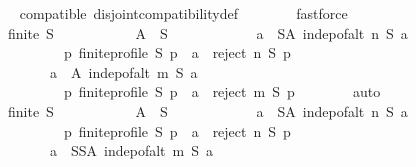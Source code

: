 \begin{isabellebody}
\ \ \ \ \ \ \isamarkupfalse%
\ compatible\ disjoint{\isacharunderscore}{\kern0pt}compatibility{\isacharunderscore}{\kern0pt}def\isanewline
\ \ \ \ \ \ \isamarkupfalse%
\ fastforce\isanewline
\ \ \ \ \isamarkupfalse%
\isanewline
\ \ \ \ \ \ {\isachardoublequoteopen}finite\ S\ {\isasymlongrightarrow}\isanewline
\ \ \ \ \ \ \ \ \ \ {\isacharparenleft}{\kern0pt}{\isasymexists}A\ {\isasymsubseteq}\ S{\isachardot}{\kern0pt}\isanewline
\ \ \ \ \ \ \ \ \ \ \ \ {\isacharparenleft}{\kern0pt}{\isasymforall}a\ {\isasymin}\ S{\isacharminus}{\kern0pt}A{\isachardot}{\kern0pt}\ indep{\isacharunderscore}{\kern0pt}of{\isacharunderscore}{\kern0pt}alt\ n\ S\ a\ {\isasymand}\isanewline
\ \ \ \ \ \ \ \ \ \ \ \ \ \ {\isacharparenleft}{\kern0pt}{\isasymforall}p{\isachardot}{\kern0pt}\ finite{\isacharunderscore}{\kern0pt}profile\ S\ p\ {\isasymlongrightarrow}\ a\ {\isasymin}\ reject\ n\ S\ p{\isacharparenright}{\kern0pt}{\isacharparenright}{\kern0pt}\ {\isasymand}\isanewline
\ \ \ \ \ \ \ \ \ \ \ \ {\isacharparenleft}{\kern0pt}{\isasymforall}a\ {\isasymin}\ A{\isachardot}{\kern0pt}\ indep{\isacharunderscore}{\kern0pt}of{\isacharunderscore}{\kern0pt}alt\ m\ S\ a\ {\isasymand}\isanewline
\ \ \ \ \ \ \ \ \ \ \ \ \ \ {\isacharparenleft}{\kern0pt}{\isasymforall}p{\isachardot}{\kern0pt}\ finite{\isacharunderscore}{\kern0pt}profile\ S\ p\ {\isasymlongrightarrow}\ a\ {\isasymin}\ reject\ m\ S\ p{\isacharparenright}{\kern0pt}{\isacharparenright}{\kern0pt}{\isacharparenright}{\kern0pt}{\isachardoublequoteclose}\isanewline
\ \ \ \ \ \ \isamarkupfalse%
\ auto\isanewline
\ \ \ \ \isamarkupfalse%
\isanewline
\ \ \ \ \ \ {\isachardoublequoteopen}finite\ S\ {\isasymlongrightarrow}\isanewline
\ \ \ \ \ \ \ \ \ \ {\isacharparenleft}{\kern0pt}{\isasymexists}A\ {\isasymsubseteq}\ S{\isachardot}{\kern0pt}\isanewline
\ \ \ \ \ \ \ \ \ \ \ \ {\isacharparenleft}{\kern0pt}{\isasymforall}a\ {\isasymin}\ S{\isacharminus}{\kern0pt}A{\isachardot}{\kern0pt}\ indep{\isacharunderscore}{\kern0pt}of{\isacharunderscore}{\kern0pt}alt\ n\ S\ a\ {\isasymand}\isanewline
\ \ \ \ \ \ \ \ \ \ \ \ \ \ {\isacharparenleft}{\kern0pt}{\isasymforall}p{\isachardot}{\kern0pt}\ finite{\isacharunderscore}{\kern0pt}profile\ S\ p\ {\isasymlongrightarrow}\ a\ {\isasymin}\ reject\ n\ S\ p{\isacharparenright}{\kern0pt}{\isacharparenright}{\kern0pt}\ {\isasymand}\isanewline
\ \ \ \ \ \ \ \ \ \ \ \ {\isacharparenleft}{\kern0pt}{\isasymforall}a\ {\isasymin}\ S{\isacharminus}{\kern0pt}{\isacharparenleft}{\kern0pt}S{\isacharminus}{\kern0pt}A{\isacharparenright}{\kern0pt}{\isachardot}{\kern0pt}\ indep{\isacharunderscore}{\kern0pt}of{\isacharunderscore}{\kern0pt}alt\ m\ S\ a\ {\isasymand}\isanewline

\end{isabellebody}
